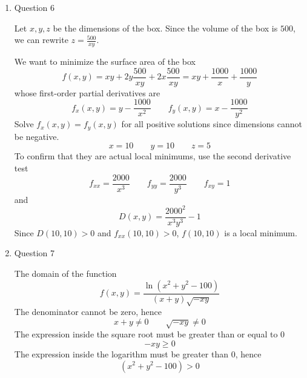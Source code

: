 \documentclass[11pt]{article}
\begin{document}
\begin{enumerate}
    \item Question 6
    
    Let $x,y,z$ be the dimensions of the box. Since the volume of the box is $500$, we can rewrite $z=\frac{500}{xy}$.
    
    We want to minimize the surface area of the box
    $$
    f(x,y) = xy+2y\frac{500}{xy}+2x\frac{500}{xy} = xy+\frac{1000}{x}+\frac{1000}{y}
    $$
    whose first-order partial derivatives are
    $$
    f_x(x,y) = y-\frac{1000}{x^2} \qquad f_y(x,y) = x-\frac{1000}{y^2}
    $$
    Solve $f_x(x,y)=f_y(x,y)$ for all positive solutions since dimensions cannot be negative.
    $$
    x=10 \qquad y=10 \qquad z=5
    $$
    To confirm that they are actual local minimums, use the second derivative test
    $$
    f_{xx} = \frac{2000}{x^3} \qquad f_{yy} = \frac{2000}{y^3} \qquad f_{xy}= 1
    $$
    and
    $$
    D(x,y) = \frac{2000^2}{x^3y^3} - 1
    $$
    Since $D(10,10)>0$ and $f_{xx}(10,10)>0$, $f(10,10)$ is a local minimum.
    
    \item Question 7
    
    The domain of the function
    $$
    f(x,y) = \frac{\ln(x^2+y^2-100)}{(x+y)\sqrt{-xy}}
    $$
    The denominator cannot be zero, hence
    $$
    x+y \neq 0 \qquad \sqrt{-xy} \neq 0
    $$
    The expression inside the square root must be greater than or equal to 0
    $$
    -xy \geq 0
    $$
    The expression inside the logarithm must be greater than 0, hence
    $$
    (x^2+y^2-100)>0
    $$
    


    
    \begin{center}
        \begin{tikzpicture}[x=0.75pt,y=0.75pt,yscale=-1,xscale=1]
        

\end{tikzpicture}
\end{center}
\end{enumerate}
\end{document}
